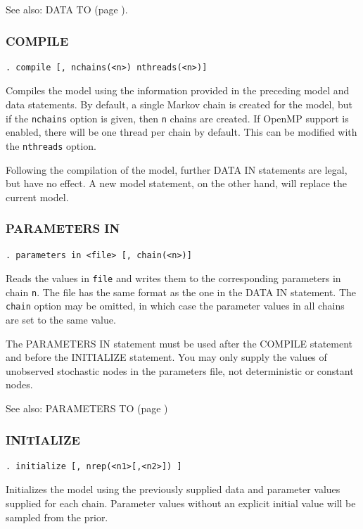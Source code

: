 \documentclass[11pt, a4paper, titlepage]{report}
\begin{document}
See also: DATA TO (page \pageref{data:to}).

\subsubsection{COMPILE}

\begin{verbatim}
. compile [, nchains(<n>) nthreads(<n>)]
\end{verbatim}
Compiles the model using the information provided in the preceding
model and data statements. By default, a single Markov chain is
created for the model, but if the \texttt{nchains} option is given,
then \texttt{n} chains are created. If OpenMP support is enabled,
there will be one thread per chain by default. This can be modified
with the \texttt{nthreads} option.

Following the compilation of the model, further DATA IN statements are
legal, but have no effect.  A new model statement, on the other hand,
will replace the current model.

\subsubsection{PARAMETERS IN}
\label{parameters:in}

\begin{verbatim}
. parameters in <file> [, chain(<n>)]
\end{verbatim}
Reads the values in \texttt{file} and writes them to the corresponding
parameters in chain \texttt{n}. The file has the same format as the
one in the DATA IN statement.  The \texttt{chain} option may be
omitted, in which case the parameter values in all chains are set to
the same value.

The PARAMETERS IN statement must be used after the COMPILE statement
and before the INITIALIZE statement.  You may only supply the values of
unobserved stochastic nodes in the parameters file, not deterministic or
constant nodes.

See also: PARAMETERS TO (page \pageref{parameters:to})

\subsubsection{INITIALIZE}

\begin{verbatim}
. initialize [, nrep(<n1>[,<n2>]) ]
\end{verbatim}
Initializes the model using the previously supplied data and parameter
values supplied for each chain. Parameter values without an explicit
initial value will be sampled from the prior.
\end{document}
